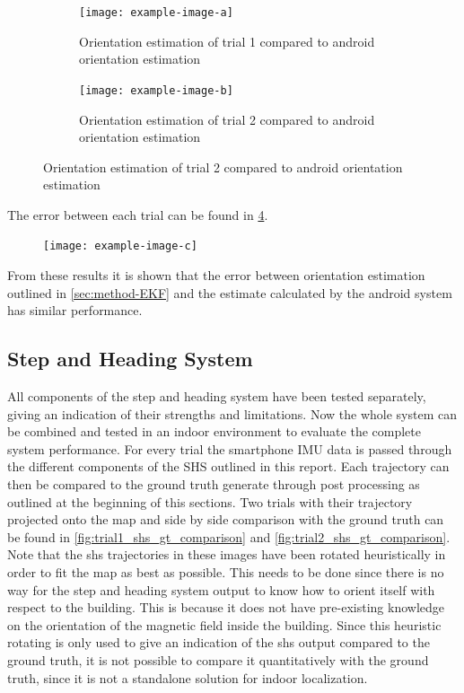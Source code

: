 \begin{figure}[H]
	\centering
	\begin{subfigure}[t]{.45\textwidth}
	\centering
	\texttt{[image: example-image-a]}
	\caption{Orientation estimation of trial 1 compared to android orientation estimation}
	\label{fig:trail1 - shs}
\end{subfigure}\quad
\begin{subfigure}[t]{.45\textwidth}
	\centering
	\texttt{[image: example-image-b]}
	\caption{Orientation estimation of trial 2 compared to android orientation estimation}
	\label{fig:trail2 - shs}
\end{subfigure}
\end{figure}

The error between each trial can be found in \cref{fig:orientation_comparison}.

\begin{figure}[H]
	\centering
	\texttt{[image: example-image-c]}
	\caption{}
	\label{fig:orientation_comparison}
\end{figure}

From these results it is shown that the error between  orientation estimation outlined in \cref{sec:method-EKF} and the estimate calculated by the android system has similar performance.

\subsection{Step and Heading System}
All components of the step and heading system have been tested separately, giving an indication of their strengths and limitations. Now the whole system can be combined and tested in an indoor environment to evaluate the complete system performance.
For every trial the smartphone IMU data is passed through the different components of the SHS outlined in this report. Each trajectory can then be compared to the ground truth generate through post processing as outlined at the beginning of this sections. Two trials with their trajectory projected onto the map and side by side comparison with the ground truth can be found in \cref{fig:trial1_shs_gt_comparison} and \cref{fig:trial2_shs_gt_comparison}. Note that the shs trajectories in these images have been rotated heuristically in order to fit the map as best as possible. This needs to be done since there is no way for the step and heading system output to know how to orient itself with respect to the building. This is because it does not have pre-existing knowledge on the orientation of the magnetic field inside the building. Since this heuristic rotating is only used to give an indication of the shs output compared to the ground truth, it is not possible to compare it quantitatively with the ground truth, since it is not a standalone solution for indoor localization.

